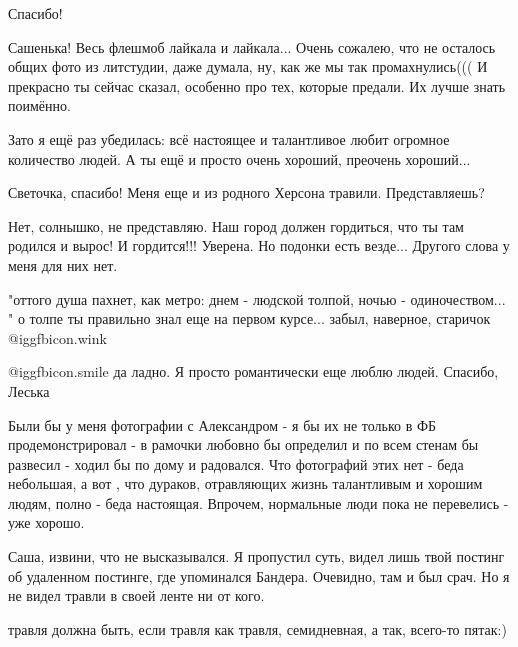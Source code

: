 \begin{itemize}
Спасибо!


Сашенька! Весь флешмоб лайкала и лайкала... Очень сожалею, что не осталось
общих фото из литстудии, даже думала, ну, как же мы так промахнулись((( И
прекрасно ты сейчас сказал, особенно про тех, которые предали. Их лучше знать
поимённо.

Зато я ещё раз убедилась: всё настоящее и талантливое любит огромное количество
людей. А ты ещё и просто очень хороший, преочень хороший...

\begin{itemize} %
Светочка, спасибо! Меня еще и из родного Херсона травили. Представляешь?


Нет, солнышко, не представляю. Наш город должен гордиться, что ты там родился и вырос! И гордится!!! Уверена.
Но подонки есть везде... Другого слова у меня для них нет.
\end{itemize} %


"оттого душа пахнет, как метро: днем - людской толпой, ночью - одиночеством...
" о толпе ты правильно знал еще на первом курсе... забыл, наверное, старичок  @igg{fbicon.wink} 

\begin{itemize} %
 @igg{fbicon.smile}  да ладно. Я просто романтически еще люблю людей. Спасибо, Леська
\end{itemize} %


Были бы у меня фотографии с Александром - я бы их не только в ФБ
продемонстрировал - в рамочки любовно бы определил и по всем стенам бы развесил
- ходил бы по дому и радовался. Что фотографий этих нет - беда небольшая, а вот
, что дураков, отравляющих жизнь талантливым и хорошим людям, полно - беда
настоящая. Впрочем, нормальные люди пока не перевелись - уже хорошо.



Саша, извини, что не высказывался. Я пропустил суть, видел лишь твой постинг об
удаленном постинге, где упоминался Бандера. Очевидно, там и был срач. Но я не
видел травли в своей ленте ни от кого.


травля должна быть, если травля как травля, семидневная, а так, всего-то пятак:)


\end{itemize}

